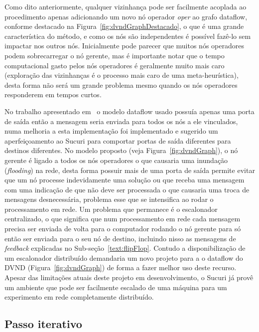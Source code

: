 Como dito anteriormente, qualquer vizinhança pode ser facilmente acoplada ao procedimento apenas adicionando um novo nó operador \textit{oper} ao grafo dataflow, conforme destacado na Figura~\ref{fig:dvndGraphDestacado}, o que é uma grande característica do método, e como os nós são independentes é possível fazê-lo sem impactar nos outros nós.
Inicialmente pode parecer que muitos nós operadores podem sobrecarregar o nó gerente, mas é importante notar que o tempo computacional gasto pelos nós operadores é geralmente muito mais caro (exploração das vizinhanças é o processo mais caro de uma meta-heurística), desta forma não será um grande problema mesmo quando os nós operadores responderem em tempos curtos.

No trabalho apresentado em~\cite{df-dvnd2018} o modelo dataflow usado possuía apenas uma porta de saída então a mensagem seria enviada para todos os nós a ele vinculados, numa melhoria a esta implementação foi implementado e sugerido um aperfeiçoamento ao Sucuri para comportar portas de saída diferentes para destinos diferentes.
No modelo proposto (veja Figura~\ref{fig:dvndGraph}), o nó gerente é ligado a todos os nós operadores o que causaria uma inundação (\emph{flooding}) na rede, desta forma possuir mais de uma porta de saída permite evitar que um nó processe indevidamente uma solução ou que receba uma mensagem com uma indicação de que não deve ser processada o que causaria uma troca de mensagens desnecessária, problema esse que se intensifica ao rodar o processamento em rede.
Um problema que permanece é o escalonador centralizado, o que significa que num processamento em rede cada mensagem precisa ser enviada de volta para o computador rodando o nó gerente para só então ser enviada para o seu nó de destino, incluindo nisso as mensagens de \emph{feedback} explicadas no Sub-seção~\ref{text:flipFlop}.
Contudo a disponibilização de um escalonador distribuído demandaria um novo projeto para a o dataflow do DVND (Figura~\ref{fig:dvndGraph}) de forma a fazer melhor uso deste recurso.
Apesar das limitações atuais deste projeto em desenvolvimento, o Sucuri já provê um ambiente que pode ser facilmente escalado de uma máquina para um experimento em rede completamente distribuído.

\subsection{Passo iterativo}


